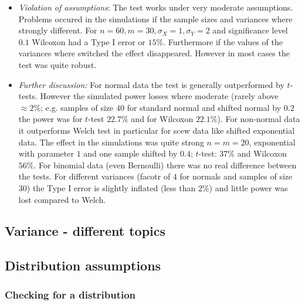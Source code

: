 \documentclass[12pt,a4paper]{amsart}
\theoremstyle{definition}
\theoremstyle{remark}
\numberwithin{equation}{section}
\begin{document}
\begin{itemize}
\begin{itemize}
\item \textit{Violation of assumptions}: The test works under very moderate assumptions. Problems occured in the simulations if the sample sizes and variances where strongly different. For $n=60, m=30, \sigma_X=1, \sigma_Y=2$ and significance level $0.1$ Wilcoxon had a Type I error or $15\%$.  Furthermore if the values of the variances where switched the effect disappeared. However in most cases the test was quite robust.


\item \textit{Further discussion:} For normal data the test is generally outperformed by $t$-tests. However the simulated power losses where moderate (rarely above $\approx 2\%$; e.g. samples of size $40$ for standard normal and shifted normal by $0.2$ the power was for $t$-test $22.7\%$ and for Wilcoxon $22.1\%$). For non-normal data it outperforms Welch test in particular for scew data like shifted exponential data. The effect in the simulations was quite strong $n=m=20$, exponential with parameter $1$ and one sample shifted by $0.4$; $t$-test: $37\%$ and Wilcoxon $56\%$. For binomial data (even Bernoulli) there was no real difference between the tests. For different variances (facotr of $4$ for normals and samples of size $30$) the Type I error is slightly inflated (less than $2\%$) and little power was lost compared to Welch.  
\end{itemize}
\end{itemize}

\subsection{Variance - different topics}

\subsection{Distribution assumptions}
\subsubsection{Checking for a distribution}
\end{document}
